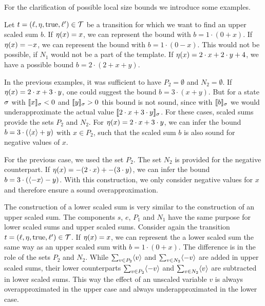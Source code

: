 For the clarification of possible local size bounds we introduce some examples.

\begin{example}
  Let $t = (\ell,\eta,\text{true},\ell') \in \mathcal{T}$ be a transition for which we want to find an upper scaled sum $b$.
  If $\eta(x) = x$, we can represent the bound with $b = 1 \cdot (0 + x)$.
  If $\eta(x) = -x$, we can represent the bound with $b = 1 \cdot (0 - x)$.
  This would not be possible, if $N_1$ would not be a part of the template.
  If $\eta(x) = 2 \cdot x + 2 \cdot y + 4$, we have a possible bound $b = 2 \cdot (2 + x + y)$.
  
  In the previous examples, it was sufficient to have $P_2 = \emptyset$ and $N_2 = \emptyset$.
  If $\eta(x) = 2 \cdot x + 3 \cdot y$, one could suggest the bound $b = 3 \cdot (x + y)$.
  But for a state $\sigma$ with $\llbracket x \rrbracket_{\sigma} < 0$ and $\llbracket y \rrbracket_{\sigma} > 0$ this bound is not sound, since with $\llbracket b \rrbracket_{\sigma}$ we would underapproximate the actual value $\llbracket 2 \cdot x + 3 \cdot y \rrbracket_{\sigma}$.
  For these cases, scaled sums provide the sets $P_2$ and $N_2$.
  For $\eta(x) = 2 \cdot x + 3 \cdot y$, we can infer the bound $b = 3 \cdot (\langle x\rangle + y)$ with $x \in P_2$, such that the scaled sum $b$ is also sound for negative values of $x$.
  
  For the previous case, we used the set $P_2$.
  The set $N_2$ is provided for the negative counterpart.
  If $\eta(x) = -(2 \cdot x) + -(3 \cdot y)$, we can infer the bound $b = 3 \cdot (\langle-x\rangle - y)$.
  With this construction, we only consider negative values for $x$ and therefore ensure a sound overapproximation.
  
  The construction of a lower scaled sum is very similar to the construction of an upper scaled sum.
  The components $s$, $e$, $P_1$ and $N_1$ have the same purpose for lower scaled sums and upper scaled sums.
  Consider again the transition $t = (\ell,\eta,\text{true},\ell') \in \mathcal{T}$.
  If $\eta(x) = x$, we can represent the a lower scaled sum the same way as an upper scaled sum with $b = 1 \cdot (0 + x)$.
  The difference is in the role of the sets $P_2$ and $N_2$.
  While $\sum_{v \in P_2} \langle v\rangle$ and $\sum_{v \in N_2} \langle-v\rangle$ are added in upper scaled sums, their lower counterparts $\sum_{v \in P_2} \langle-v\rangle$ and $\sum_{v \in N_2} \langle v\rangle$ are subtracted in lower scaled sums.
  This way the effect of an unscaled variable $v$ is always overapproximated in the upper case and always underapproximated in the lower case.
\end{example}

